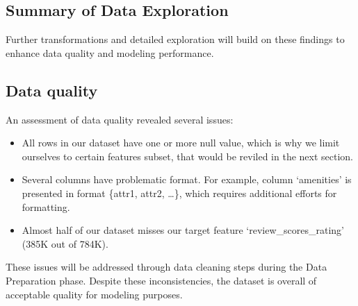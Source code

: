 \subsection{Summary of Data Exploration}\label{sec:dataExplorationSummary}

Further transformations and detailed exploration will build on these findings to enhance data quality and modeling performance.



\subsection{Data quality}\label{sec:dataQuality}
An assessment of data quality revealed several issues:

\begin{itemize}
    \item All rows in our dataset have one or more null value, which is why we limit ourselves to certain features subset, that would be reviled in the next section.
    \item Several columns have problematic format. For example, column `amenities' is presented in format \{attr1, attr2, \ldots \}, which requires additional efforts for formatting.
    \item Almost half of our dataset misses our target feature `review\_scores\_rating' (385K out of 784K).
\end{itemize}

These issues will be addressed through data cleaning steps during the Data Preparation phase. Despite these inconsistencies, the dataset is overall of acceptable quality for modeling purposes.
